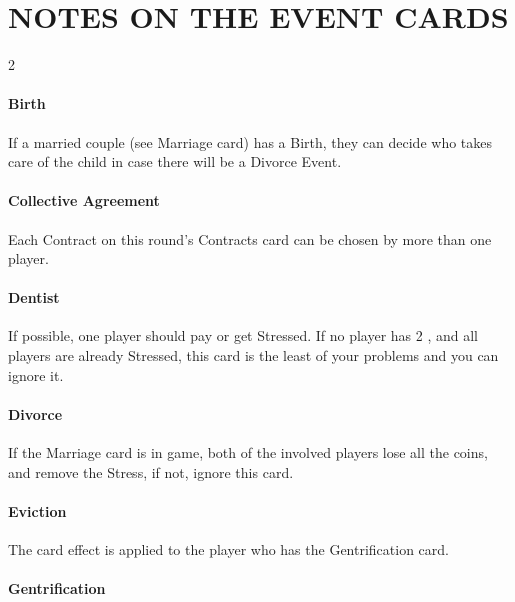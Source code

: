 \section{NOTES ON THE EVENT CARDS}

    \begin{multicols}{2}
    
        \paragraph{Birth}
    
            If a married couple (see Marriage card) has a Birth, they can decide who
            takes care of the child in case there will be a Divorce Event.
    
        \paragraph{Collective Agreement}
    
            Each Contract on this round's Contracts card can be
            chosen by more than one player.
    
        \paragraph{Dentist}
    
            If possible, one player should pay or get Stressed. If no player has 2 \faRubleSign,
            and all players are already Stressed, this card is the least of your problems and
            you can ignore it.
    
        \paragraph{Divorce}
    
            If the Marriage card is in game, both of the involved players lose all the
            coins, and remove the Stress, if not, ignore this card.
    
        \paragraph{Eviction}
    
            The card effect is applied to the player who has the Gentrification card.
    
        \paragraph{Gentrification}
    

\end{multicols}
